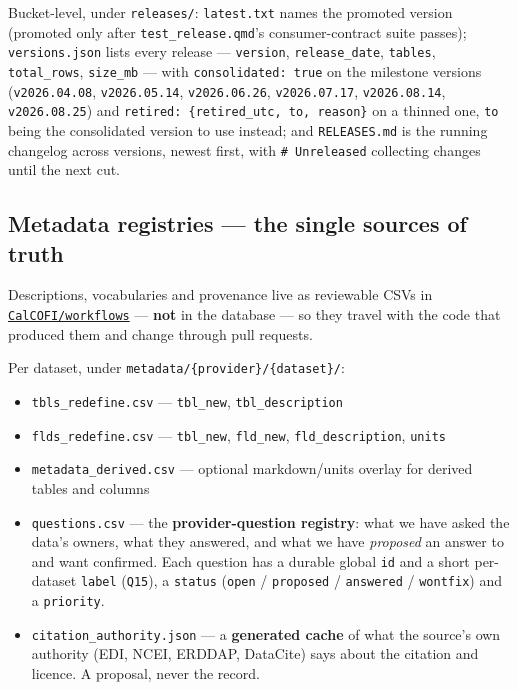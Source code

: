\documentclass[
  letterpaper,
  DIV=11,
  numbers=noendperiod]{scrreprt}
\providecommand{\tightlist}{%
  \setlength{\itemsep}{0pt}\setlength{\parskip}{0pt}}
\begin{document}
Bucket-level, under \texttt{releases/}: \texttt{latest.txt} names the
promoted version (promoted only after \texttt{test\_release.qmd}'s
consumer-contract suite passes); \texttt{versions.json} lists every
release --- \texttt{version}, \texttt{release\_date}, \texttt{tables},
\texttt{total\_rows}, \texttt{size\_mb} --- with
\texttt{consolidated:\ true} on the milestone versions
(\texttt{v2026.04.08}, \texttt{v2026.05.14}, \texttt{v2026.06.26},
\texttt{v2026.07.17}, \texttt{v2026.08.14}, \texttt{v2026.08.25}) and
\texttt{retired:\ \{retired\_utc,\ to,\ reason\}} on a thinned one,
\texttt{to} being the consolidated version to use instead; and
\texttt{RELEASES.md} is the running changelog across versions, newest
first, with \texttt{\#\ Unreleased} collecting changes until the next
cut.

\subsection{Metadata registries --- the single sources of
truth}\label{metadata-registries-the-single-sources-of-truth}

Descriptions, vocabularies and provenance live as reviewable CSVs in
\href{https://github.com/CalCOFI/workflows}{\texttt{CalCOFI/workflows}}
--- \textbf{not} in the database --- so they travel with the code that
produced them and change through pull requests.

Per dataset, under \texttt{metadata/\{provider\}/\{dataset\}/}:

\begin{itemize}
\tightlist
\item
  \texttt{tbls\_redefine.csv} --- \texttt{tbl\_new},
  \texttt{tbl\_description}
\item
  \texttt{flds\_redefine.csv} --- \texttt{tbl\_new}, \texttt{fld\_new},
  \texttt{fld\_description}, \texttt{units}
\item
  \texttt{metadata\_derived.csv} --- optional markdown/units overlay for
  derived tables and columns
\item
  \texttt{questions.csv} --- the \textbf{provider-question registry}:
  what we have asked the data's owners, what they answered, and what we
  have \emph{proposed} an answer to and want confirmed. Each question
  has a durable global \texttt{id} and a short per-dataset
  \texttt{label} (\texttt{Q15}), a \texttt{status} (\texttt{open} /
  \texttt{proposed} / \texttt{answered} / \texttt{wontfix}) and a
  \texttt{priority}.
\item
  \texttt{citation\_authority.json} --- a \textbf{generated cache} of
  what the source's own authority (EDI, NCEI, ERDDAP, DataCite) says
  about the citation and licence. A proposal, never the record.
\end{itemize}
\end{document}
